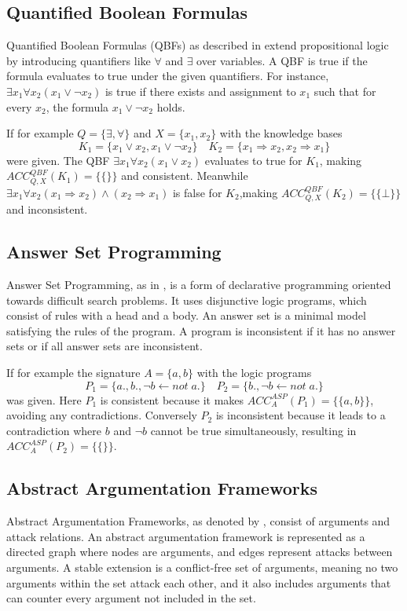 \subsection{Quantified Boolean Formulas}
Quantified Boolean Formulas (QBFs) as described in \cite{gelfond_logic_2002} extend propositional logic by introducing quantifiers like \(\forall\) and \(\exists\) over variables.
A QBF is true if the formula evaluates to true under the given quantifiers.
For instance, \(\exists x_1 \forall x_2 (x_1 \lor \neg x_2)\) is true if there exists and assignment to \(x_1\) such that for every \(x_2\), the formula \(x_1 \lor \neg x_2\) holds.

If for example \(Q = \{\exists,\forall\}\) and \(X = \{x_1,x_2\}\) with the knowledge bases
\[K_1 = \{x_1 \lor  x_2, x_1 \lor \neg x_2\} \quad K_2 = \{x_1 \Rightarrow x_2, x_2 \Rightarrow x_1\}\]
were given.
The QBF \(\exists x_1 \forall x_2 (x_1 \lor x_2)\) evaluates to true for \(K_1\), making \(ACC^{QBF}_{Q,X}(K_1) = \{\{\}\}\) and consistent.
Meanwhile \(\exists x_1 \forall x_2 (x_1 \Rightarrow x_2) \land (x_2 \Rightarrow x_1)\) is false for \(K_2\),making \(ACC^{QBF}_{Q,X}(K_2) = \{\{\bot\}\}\) and inconsistent.

\subsection{Answer Set Programming}
Answer Set Programming, as in \cite{brewka_answer_2011}, is a form of declarative programming oriented towards difficult search problems.
It uses disjunctive logic programs, which consist of rules with a head and a body.
An answer set is a minimal model satisfying the rules of the program.
A program is inconsistent if it has no answer sets or if all answer sets are inconsistent.

If for example the signature \(A = \{a,b\}\) with the logic programs
\[P_1 = \{a., b., \neg b \leftarrow not \; a.\} \quad P_2 = \{b., \neg b \leftarrow not \; a.\}\]
was given.
Here \(P_1\) is consistent because it makes \(ACC^{ASP}_{A}(P_1) = \{\{a,b\}\}\), avoiding any contradictions.
Conversely \(P_2\) is inconsistent because it leads to a contradiction where \(b\) and \(\neg b\) cannot be true simultaneously, resulting in \(ACC^{ASP}_{A}(P_2) = \{\{\}\}\).

\subsection{Abstract Argumentation Frameworks}
Abstract Argumentation Frameworks, as denoted by \cite{dung_acceptability_1995}, consist of arguments and attack relations.
An abstract argumentation framework is represented as a directed graph where nodes are arguments, and edges represent attacks between arguments.
A stable extension is a conflict-free set of arguments, meaning no two arguments within the set attack each other, and it also includes arguments that can counter every argument not included in the set.

